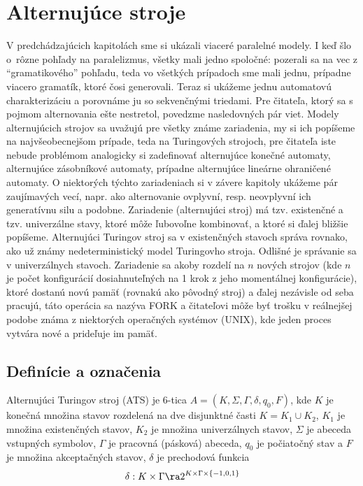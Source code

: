 \chapter{Alternujúce stroje}

V predchádzajúcich kapitolách sme si ukázali viaceré paralelné
modely. I keď šlo \mbox{o rôzne} pohľady na paralelizmus, všetky
mali jedno spoločné: pozerali sa na vec z ``gramatikového''
pohľadu, teda vo všetkých prípadoch sme mali jednu, prípadne
viacero gramatík, ktoré čosi generovali. Teraz si ukážeme jednu
automatovú charakterizáciu a porovnáme ju so sekvenčnými triedami.
Pre čitateľa, ktorý sa s pojmom alternovania ešte nestretol,
povedzme nasledovných pár viet. Modely alternujúcich strojov sa
uvažujú pre všetky známe zariadenia, my si ich popíšeme na
najvšeobecnejšom prípade, teda na Turingových strojoch, pre
čitateľa iste nebude problémom analogicky si zadefinovať
alternujúce konečné automaty, alternujúce zásobníkové automaty,
prípadne alternujúce lineárne ohraničené automaty. O niektorých
týchto zariadeniach si v závere kapitoly ukážeme pár zaujímavých
vecí, napr. ako alternovanie ovplyvní, resp. neovplyvní ich
generatívnu silu a podobne. Zariadenie (alternujúci stroj) má tzv.
existenčné a tzv. univerzálne stavy, ktoré môže ľubovoľne
kombinovať, a ktoré si ďalej bližšie popíšeme. Alternujúci
Turingov stroj sa v existenčných stavoch správa rovnako, ako už
známy nedeterministický model Turingovho stroja. Odlišné je
správanie sa v univerzálnych stavoch. Zariadenie sa akoby rozdelí
na $n$ nových strojov (kde $n$ je počet konfigurácií
dosiahnuteľných na 1 krok z jeho momentálnej konfigurácie), ktoré
dostanú novú pamäť (rovnakú ako pôvodný stroj) a ďalej nezávisle
od seba pracujú, táto operácia sa nazýva FORK a čitateľovi môže
byť trošku v reálnejšej podobe známa z niektorých operačných
systémov (UNIX), kde jeden proces vytvára nové a prideľuje im
pamäť.

\section{Definície a označenia}

\begin{definicia}
Alternujúci Turingov stroj (ATS) je 6-tica
$A=(K,\Sigma,\Gamma,\delta,q_0,F)$, kde $K$ je konečná množina
stavov rozdelená na dve disjunktné časti $K=K_1\cup K_2$, $K_1$ je
množina exis\-tenčných stavov, $K_2$ je množina univerzálnych
stavov, $\Sigma$ je abeceda vstupných symbolov, $\Gamma$ je
pracovná (pásková) abeceda, $q_0$ je počiatočný stav a $F$ je
množina akceptačných stavov, $\delta$ je prechodová funkcia
\[
\delta:K\times\Gamma\ra 2^{K\times\Gamma\times\{-1,0,1\}}
\]
\end{definicia}


